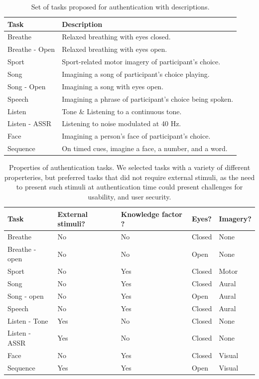 \documentclass[letterpaper,twocolumn,10pt]{article}
\begin{document}
\begin{table}[h]
\centering
\begin{tabular}{ll}
\textbf{\textbf{Task}} & \textbf{\textbf{Description}}\\
\hline
Breathe & Relaxed breathing with eyes closed.\\
Breathe - Open & Relaxed breathing with eyes open.\\
Sport & Sport-related motor imagery of participant's choice.\\
Song & Imagining a song of participant's choice playing.\\
Song - Open & Imagining a song with eyes open.\\
Speech & Imagining a phrase of participant's choice being spoken.\\
Listen & Tone \& Listening to a continuous tone.\\
Listen - ASSR & Listening to noise modulated at 40 Hz.\\
Face & Imagining a person's face of participant's choice.\\
Sequence & On timed cues, imagine a face, a number, and a word.\\
\hline
\end{tabular}
\caption{Set of tasks proposed for authentication with descriptions.}
\end{table}

\begin{table}[h]
\centering
\begin{tabular}{lllll}
Task & External stimuli? & Knowledge factor ? & Eyes? & Imagery?\\
\hline
Breathe & No & No & Closed & None\\
Breathe - open & No & No & Open & None\\
Sport & No & Yes & Closed & Motor\\
Song & No & Yes & Closed & Aural\\
Song - open & No & Yes & Open & Aural\\
Speech & No & Yes & Closed & Aural\\
Listen - Tone & Yes & No & Closed & None\\
Listen - ASSR & Yes & No & Closed & None\\
Face & No & Yes & Closed & Visual\\
Sequence & Yes & Yes & Open & Visual\\
\hline
\end{tabular}
\caption{Properties of authentication tasks. We selected tasks with a variety of different properteries, but preferred tasks that did not require external stimuli, as the need to present such stimuli at authentication time could present challenges for usability, and user security.}
\end{table}
\end{document}

